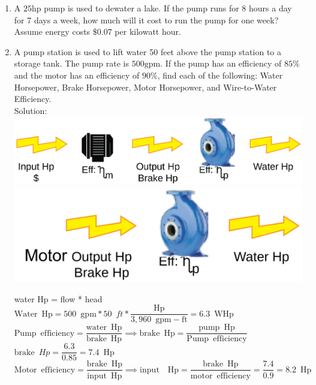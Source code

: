 \documentclass{article}
\begin{document}
\begin{enumerate}
  \item A $25 \mathrm{hp}$ pump is used to dewater a lake. If the pump runs for 8 hours a day for 7 days a week, how much will it cost to run the pump for one week? Assume energy costs $\$ 0.07$ per kilowatt hour.

  \item A pump station is used to lift water 50 feet above the pump station to a storage tank. The pump rate is $500 \mathrm{gpm}$. If the pump has an efficiency of $85 \%$ and the motor has an efficiency of $90 \%$, find each of the following: Water Horsepower, Brake Horsepower, Motor Horsepower, and Wire-to-Water Efficiency.\\
 \vspace{0.2cm}
Solution:\\
 \vspace{0.4cm}\includegraphics[scale=0.08]{PumpProblem}\\
 \vspace{0.2cm}
 \includegraphics[scale=0.32]{PumpingProblemPump}
 \vspace{0.2cm}

water Hp = flow * head\\
 \vspace{0.2cm}
$\mathrm{Water} \enspace \mathrm{Hp} = 500 \enspace \mathrm{gpm}*50 \enspace ft*\dfrac{\mathrm{Hp}}{3,960 \enspace \mathrm{gpm-ft}}=\boxed{ 6.3 \enspace \mathrm{WHp}}$\\ 
  \vspace{0.2cm}
$\mathrm{Pump \enspace efficiency} =\dfrac{\mathrm{water \enspace Hp}}{\mathrm{brake \enspace Hp}} \implies \mathrm{brake \enspace Hp}=\dfrac{\mathrm{pump \enspace Hp}}{\mathrm{Pump \enspace efficiency}}$ \\
  \vspace{0.2cm}
$\textrm{brake} \enspace Hp = \dfrac{6.3}{0.85}=\boxed{7.4 \enspace \mathrm{Hp}}$\\
  \vspace{0.2cm}
$\mathrm{Motor \enspace efficiency} =\dfrac{\mathrm{brake \enspace Hp}}{\mathrm{input \enspace Hp}} \implies \mathrm{input \enspace \enspace Hp}=\dfrac{\mathrm{brake \enspace Hp}}{\mathrm{motor \enspace efficiency}}= \dfrac{7.4}{0.9}=\boxed{8.2 \enspace \mathrm{Hp}}$\\
  \vspace{0.2cm}
  

\end{enumerate}
\end{document}
